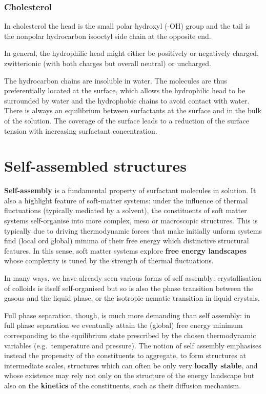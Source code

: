 \documentclass[
  letterpaper,
  enabledeprecatedfontcommands]{report}
\begin{document}
\subsubsection*{Cholesterol}\label{cholesterol}

In cholesterol the head is the small polar hydroxyl (-OH) group and the
tail is the nonpolar hydrocarbon isooctyl side chain at the opposite
end.

In general, the hydrophilic head might either be positively or
negatively charged, zwitterionic (with both charges but overall neutral)
or uncharged.

The hydrocarbon chains are insoluble in water. The molecules are thus
preferentially located at the surface, which allows the hydrophilic head
to be surrounded by water and the hydrophobic chains to avoid contact
with water. There is always an equilibrium between surfactants at the
surface and in the bulk of the solution. The coverage of the surface
leads to a reduction of the surface tension with increasing surfactant
concentration.

\section{Self-assembled structures}\label{self-assembled-structures}

\textbf{Self-assembly} is a fundamental property of surfactant molecules
in solution. It also a highlight feature of soft-matter systems: under
the influence of thermal fluctuations (typically mediated by a solvent),
the constituents of soft matter systems self-organise into more complex,
meso or macroscopic structures. This is typically due to driving
thermodynamic forces that make initially unform systems find (local ord
global) minima of their free energy which distinctive structural
features. In this sense, soft matter systems explore \textbf{free energy
landscapes} whose complexity is tuned by the strength of thermal
fluctuations.

In many ways, we have already seen various forms of self assembly:
crystallisation of colloids is itself self-organised but so is also the
phase transition between the gasous and the liquid phase, or the
isotropic-nematic transition in liquid crystals.

Full phase separation, though, is much more demanding than self
assembly: in full phase separation we eventually attain the (global)
free energy minimum corresponding to the equilibrium state prescribed by
the chosen thermodynamic variables (e.g.~temperature and pressure). The
notion of self assembly emphasises instead the propensity of the
constituents to aggregate, to form structures at intermediate scales,
structures which can often be only very \textbf{locally stable}, and
whose existence may rely not only on the structure of the energy
landscape but also on the \textbf{kinetics} of the constituents, such as
their diffusion mechanism.
\end{document}
